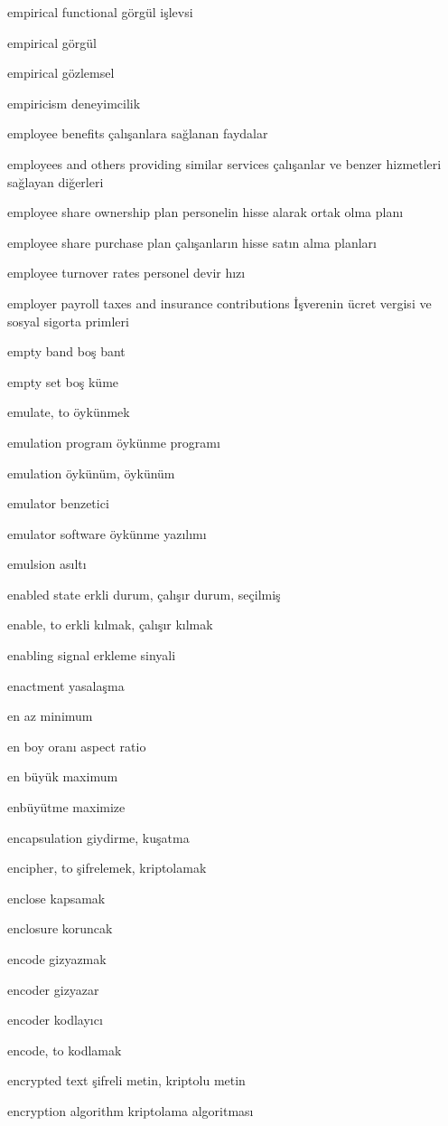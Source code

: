\documentclass[12pt,fleqn]{article}\usepackage{../../common}
\begin{document}
empirical functional görgül işlevsi

empirical görgül

empirical gözlemsel

empiricism deneyimcilik

employee benefits çalışanlara sağlanan faydalar

employees and others providing similar services çalışanlar ve benzer hizmetleri sağlayan diğerleri

employee share ownership plan personelin hisse alarak ortak olma planı

employee share purchase plan çalışanların hisse satın alma planları

employee turnover rates personel devir hızı

employer payroll taxes and insurance contributions İşverenin ücret vergisi ve sosyal sigorta primleri

empty band boş bant

empty set boş küme

emulate, to öykünmek

emulation program öykünme programı

emulation öykünüm, öykünüm

emulator benzetici

emulator software öykünme yazılımı

emulsion asıltı

enabled state erkli durum, çalışır durum, seçilmiş

enable, to erkli kılmak, çalışır kılmak

enabling signal erkleme sinyali

enactment yasalaşma

en az minimum

en boy oranı aspect ratio

en büyük maximum

enbüyütme maximize

encapsulation giydirme, kuşatma

encipher, to şifrelemek, kriptolamak

enclose kapsamak

enclosure koruncak

encode gizyazmak

encoder gizyazar

encoder kodlayıcı

encode, to kodlamak

encrypted text şifreli metin, kriptolu metin

encryption algorithm kriptolama algoritması
\end{document}
